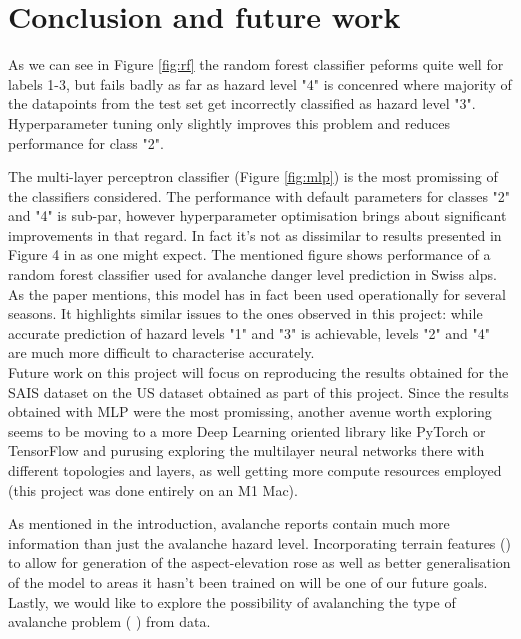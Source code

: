\documentclass{article}
\begin{document}
\section{Conclusion and future work}
	As we can see in Figure \ref{fig:rf} the random forest classifier peforms quite well for labels 1-3, but fails badly as far as hazard level "4" is concenred where majority of the datapoints from the test set get incorrectly classified as hazard level "3". Hyperparameter tuning only slightly improves this problem and reduces performance for class "2".

	The multi-layer perceptron classifier (Figure \ref{fig:mlp}) is the most promissing of the classifiers considered. The performance with default parameters for classes "2" and "4" is sub-par, however hyperparameter optimisation brings about significant improvements in that regard.
	In fact it's not as dissimilar to results presented in Figure 4 in \cite{egusphere-2024-2374} as one might expect. The mentioned figure shows performance of a random forest classifier used for avalanche danger level prediction in Swiss alps. As the paper mentions, this model has in fact been used operationally for several seasons. It highlights similar issues to the ones observed in this project: while accurate prediction of hazard levels "1" and "3" is achievable, levels "2" and "4" are much more difficult to characterise accurately. \\

	Future work on this project will focus on reproducing the results obtained for the SAIS dataset on the US dataset obtained as part of this project. Since the results obtained with MLP were the most promissing, another avenue worth exploring seems to be moving to a more Deep Learning oriented library like PyTorch or TensorFlow and purusing exploring the multilayer neural networks there with different topologies and layers, as well getting more compute resources employed (this project was done entirely on an M1 Mac).

	As mentioned in the introduction, avalanche reports contain much more information than just the avalanche hazard level. Incorporating terrain features (\cite{egusphere-2023-2948}) to allow for generation of the aspect-elevation rose as well as better generalisation of the model to areas it hasn't been trained on will be one of our future goals. Lastly, we would like to explore the possibility of avalanching the type of avalanche problem (\cite{MORIN2020102910} \cite{REUTER2022103462}) from data.
\end{document}
